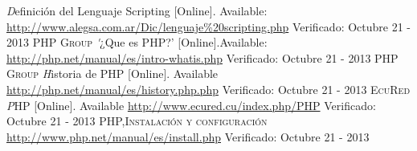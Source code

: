 \documentclass[11pt]{article} %
\begin{document}
\begin{thebibliography}{99}

\bibitem{[1]}  \textit Definición del Lenguaje Scripting [Online]. Available: \url{http://www.alegsa.com.ar/Dic/lenguaje%20scripting.php} Verificado: Octubre 21 - 2013
\bibitem{[2]}  \textsc{ PHP Group} \textit '¿Que es PHP?' [Online].Available: \url{http://php.net/manual/es/intro-whatis.php}  Verificado: Octubre 21 - 2013
\bibitem{[3]}  \textsc{ PHP Group} \textit Historia de PHP [Online]. Available \url{http://php.net/manual/es/history.php.php}  Verificado: Octubre 21 - 2013
\bibitem{[4]}  \textsc{ EcuRed} \textit PHP [Online]. Available \url{http://www.ecured.cu/index.php/PHP}  Verificado: Octubre 21 - 2013
\bibitem{[5]}  \textsc{PHP,Instalación y configuración} \url{http://www.php.net/manual/es/install.php}  Verificado: Octubre 21 - 2013

\end{thebibliography}
\end{document}

